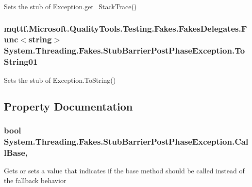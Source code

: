 Sets the stub of Exception.\-get\-\_\-\-Stack\-Trace()

\hypertarget{class_system_1_1_threading_1_1_fakes_1_1_stub_barrier_post_phase_exception_ac072e7ef80b5b211df22011eddc6e376}{
\subsubsection[{To\-String01}]{\setlength{\rightskip}{0pt plus 5cm}mqttf.\-Microsoft.\-Quality\-Tools.\-Testing.\-Fakes.\-Fakes\-Delegates.\-Func$<$string$>$ System.\-Threading.\-Fakes.\-Stub\-Barrier\-Post\-Phase\-Exception.\-To\-String01}}\label{class_system_1_1_threading_1_1_fakes_1_1_stub_barrier_post_phase_exception_ac072e7ef80b5b211df22011eddc6e376}


Sets the stub of Exception.\-To\-String()



\subsection{Property Documentation}
\hypertarget{class_system_1_1_threading_1_1_fakes_1_1_stub_barrier_post_phase_exception_a7bbaf4826fcd463ed30104703c0092a0}{
\subsubsection[{Call\-Base}]{\setlength{\rightskip}{0pt plus 5cm}bool System.\-Threading.\-Fakes.\-Stub\-Barrier\-Post\-Phase\-Exception.\-Call\-Base\hspace{0.3cm}{\ttfamily [get]}, {\ttfamily [set]}}}\label{class_system_1_1_threading_1_1_fakes_1_1_stub_barrier_post_phase_exception_a7bbaf4826fcd463ed30104703c0092a0}


Gets or sets a value that indicates if the base method should be called instead of the fallback behavior

